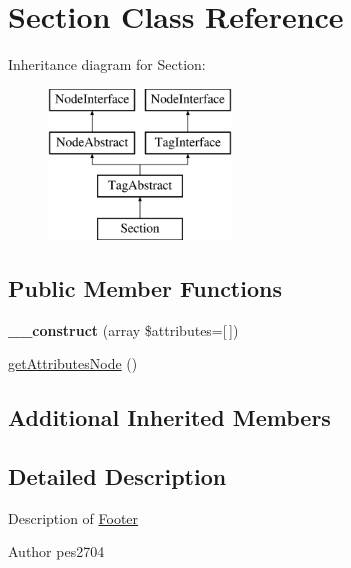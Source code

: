 \hypertarget{class_pes_1_1_dom_1_1_node_1_1_tag_1_1_section}{}\section{Section Class Reference}
\label{class_pes_1_1_dom_1_1_node_1_1_tag_1_1_section}
Inheritance diagram for Section\+:\begin{figure}[H]
\begin{center}
\leavevmode
\includegraphics[height=4.000000cm]{class_pes_1_1_dom_1_1_node_1_1_tag_1_1_section}
\end{center}
\end{figure}
\subsection*{Public Member Functions}
\begin{DoxyCompactItemize}
\item 
\mbox{\label{class_pes_1_1_dom_1_1_node_1_1_tag_1_1_section_afe55bc1439758d475e70446a774807d9}} 
{\bfseries \+\_\+\+\_\+construct} (array \$attributes=\mbox{[}$\,$\mbox{]})
\item 
\mbox{\hyperlink{class_pes_1_1_dom_1_1_node_1_1_tag_1_1_section_a4722e7722b245351681b05d35f6694f3}{get\+Attributes\+Node}} ()
\end{DoxyCompactItemize}
\subsection*{Additional Inherited Members}


\subsection{Detailed Description}
Description of \mbox{\hyperlink{class_pes_1_1_dom_1_1_node_1_1_tag_1_1_footer}{Footer}}

\begin{DoxyAuthor}{Author}
pes2704 
\end{DoxyAuthor}


